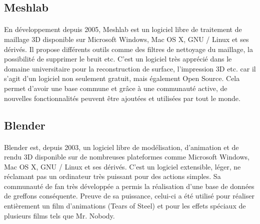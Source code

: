 \subsection{Meshlab}

\paragraph{}
	En développement depuis 2005, Meshlab est un logiciel libre de traitement de maillage 3D disponible sur Microsoft Windows, Mac OS X, GNU / Linux et ses dérivés. Il propose différents outils comme des filtres de nettoyage du maillage, la possibilité de supprimer le bruit etc. C’est un logiciel très apprécié dans le domaine universitaire pour la reconstruction de surface, l’impression 3D etc. car il s’agit d’un logiciel non seulement gratuit, mais également Open Source. Cela permet d’avoir une base commune et grâce à une communauté active, de nouvelles fonctionnalités peuvent être ajoutées et utilisées par tout le monde. 

\subsection{Blender}

\paragraph{}
	Blender est, depuis 2003, un logiciel libre de modélisation, d’animation et de rendu 3D disponible sur de nombreuses plateformes comme Microsoft Windows, Mac OS X, GNU / Linux et ses dérivés. C’est un logiciel extensible,  léger, ne réclamant pas un ordinateur très puissant pour des actions simples. Sa communauté de fan très développée a permis la réalisation d’une base de données de greffons conséquente. Preuve de sa puissance, celui-ci a été utilisé pour réaliser entièrement un film d’animations (Tears of Steel) et pour les effets spéciaux de plusieurs films tels que Mr. Nobody.
	